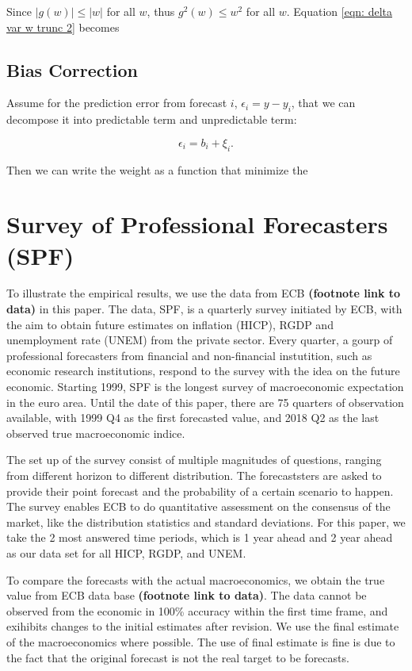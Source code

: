 \documentclass[]{article}
\begin{document}
Since \(|g(w)|\leq|w|\) for all \(w\), thus \(g^2(w) \leq w^2\) for all
\(w\). Equation \ref{eqn: delta var w trunc 2} becomes

\subsection{Bias Correction}\label{bias-correction}

Assume for the prediction error from forecast \(i\),
\(\epsilon_i = y - y_i\), that we can decompose it into predictable term
and unpredictable term:

\begin{equation}
\label{eqn: w bias assumption}
\epsilon_i = b_i + \xi_i. 
\end{equation}

Then we can write the weight as a function that minimize the

\section{Survey of Professional Forecasters
(SPF)}\label{survey-of-professional-forecasters-spf}

To illustrate the empirical results, we use the data from ECB
\textbf{(footnote link to data)} in this paper. The data, SPF, is a
quarterly survey initiated by ECB, with the aim to obtain future
estimates on inflation (HICP), RGDP and unemployment rate (UNEM) from
the private sector. Every quarter, a gourp of professional forecasters
from financial and non-financial instutition, such as economic research
institutions, respond to the survey with the idea on the future
economic. Starting 1999, SPF is the longest survey of macroeconomic
expectation in the euro area. Until the date of this paper, there are 75
quarters of observation available, with 1999 Q4 as the first forecasted
value, and 2018 Q2 as the last observed true macroeconomic indice.

The set up of the survey consist of multiple magnitudes of questions,
ranging from different horizon to different distribution. The
forecaststers are asked to provide their point forecast and the
probability of a certain scenario to happen. The survey enables ECB to
do quantitative assessment on the consensus of the market, like the
distribution statistics and standard deviations. For this paper, we take
the 2 most answered time periods, which is 1 year ahead and 2 year ahead
as our data set for all HICP, RGDP, and UNEM.

To compare the forecasts with the actual macroeconomics, we obtain the
true value from ECB data base \textbf{(footnote link to data)}. The data
cannot be observed from the economic in 100\% accuracy within the first
time frame, and exihibits changes to the initial estimates after
revision. We use the final estimate of the macroeconomics where
possible. The use of final estimate is fine is due to the fact that the
original forecast is not the real target to be forecasts.
\end{document}
